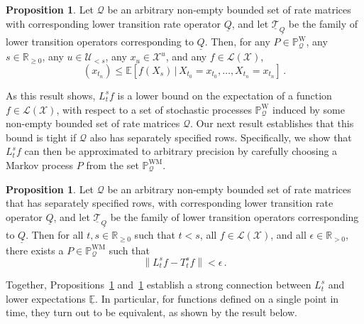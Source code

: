 \documentclass[10pt]{paper}
\theoremstyle{definition}
\newtheorem{proposition}[theorem]{Proposition}
\newcommand{\reals}{\mathbb{R}}
\newcommand{\realspos}{\reals_{>0}}
\newcommand{\realsnonneg}{\reals_{\geq 0}}
\newcommand{\states}{\mathcal{X}}
\newcommand{\processes}{\mathbb{P}}
\newcommand{\wprocesses}{\processes^{\mathrm{W}}}
\newcommand{\wmprocesses}{\processes^{\mathrm{WM}}}
\newcommand{\lbound}{L}
\newcommand{\gambles}{\mathcal{L}}
\newcommand{\gamblesX}{\gambles(\states)}
\newcommand{\rateset}{\mathcal{Q}}
\newcommand{\lrate}{\underline{Q}}
\newcommand{\norm}[1]{\left\lVert #1 \right\rVert}
\begin{document}
\begin{proposition}\label{theorem:nonmarkov_single_var_lower_bounded}
Let $\rateset$ be an arbitrary non-empty bounded set of rate matrices with corresponding lower transition rate operator $\lrate$, and let $\underline{\mathcal{T}}_{\lrate}$ be the family of lower transition operators corresponding to $\lrate$. Then, for any $P\in\wprocesses_\rateset$, any $s\in\realsnonneg$, any $u\in\mathcal{U}_{<s}$, any $x_u\in\states^u$, and any $f\in\gamblesX$,
\begin{equation*}
[L_{t_n}^s f](x_{t_n}) \leq \mathbb{E}[f(X_s)\,\vert\,X_{t_0}=x_{t_0},\ldots,X_{t_n}=x_{t_n}]\,.
\end{equation*}
\end{proposition}

As this result shows, $L_t^sf$ is a lower bound on the expectation of a function $f\in\gamblesX$, with respect to a set of stochastic processes $\wprocesses_\rateset$ induced by some non-empty bounded set of rate matrices $\rateset$. Our next result establishes that this bound is tight if $\rateset$ also has separately specified rows. Specifically, we show that $L_t^sf$ can then be approximated to arbitrary precision by carefully choosing a Markov process $P$ from the set $\wmprocesses_\rateset$.

\begin{proposition}\label{theorem:lower_markov_bound_is_tight}
Let $\rateset$ be an arbitrary non-empty bounded set of rate matrices that has separately specified rows, with corresponding lower transition rate operator $\lrate$, and let $\underline{\mathcal{T}}_{\lrate}$ be the family of lower transition operators corresponding to $\lrate$. Then for all $t,s\in\realsnonneg$ such that $t<s$, all $f\in\gamblesX$, and all $\epsilon\in\realspos$, there exists a $P\in\wmprocesses_{\rateset}$ such that
\begin{equation*}
\norm{\lbound_t^sf-T_t^sf} < \epsilon\,.
\end{equation*}
\end{proposition}

Together, Propositions~\ref{theorem:nonmarkov_single_var_lower_bounded} and~\ref{theorem:lower_markov_bound_is_tight} establish a strong connection between $L_t^s$ and lower expectations $\underline{\mathbb{E}}$. In particular, for functions defined on a single point in time, they turn out to be equivalent, as shown by the result below.
\end{document}
